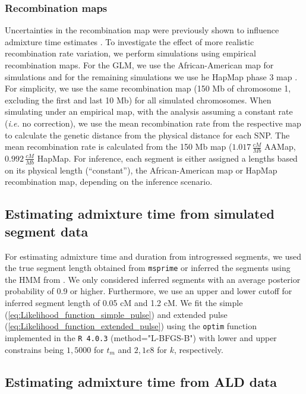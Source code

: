 \documentclass[11pt]{article}
\begin{document}
\subsubsection{Recombination maps}\label{recombination map}
Uncertainties in the recombination map were previously shown to influence admixture time estimates \citep{sankararaman_date_2012,fu_genome_2014,sankararaman_combined_2016}. To investigate the effect of more realistic
recombination rate variation, we perform simulations using empirical recombination maps. For the GLM, we use the  African-American map \citep{hinch_landscape_2011} for simulations and for the remaining simulations we use he HapMap phase 3 map \citep{HapMapConsortium_second_2007}. For simplicity, we use the same
recombination map (150 Mb of chromosome 1, excluding the first and last 10 Mb)
for all simulated chromosomes. When simulating under an empirical map, with the analysis assuming a constant rate (\emph{i.e.} no correction), we use the mean recombination rate from the respective map to calculate the genetic distance from the physical distance for each SNP. The mean recombination rate is
calculated from the 150 Mb map (\(1.017 \, \frac{cM}{Mb}\) AAMap,
\(0.992 \, \frac{cM}{Mb}\) HapMap. For inference, each segment is either assigned a lengths based on its physical length (``constant''), the African-American map or HapMap recombination map, depending on the inference scenario.

\subsection{Estimating admixture time from simulated segment data}\label{Estimating admixture time from simulated segment data}

For estimating admixture time and duration from introgressed segments, we used the true segment length obtained from \texttt{msprime} or inferred the segments using the HMM from \cite{skov_detecting_2018}. We only considered inferred segments with an average posterior probability of 0.9 or higher. Furthermore, we use an upper and lower cutoff for inferred segment length of 0.05 cM and 1.2 cM. We fit the simple (\ref{eq:Likelihood_function_simple_pulse}) and extended pulse (\ref{eq:Likelihood_function_extended_pulse}) using the \texttt{optim} function implemented in the \texttt{R 4.0.3} (method="L-BFGS-B") with lower and upper constrains being $1,5000$ for $t_m$ and $2,1e8$ for $k$, respectively. 

\subsection{Estimating admixture time from ALD data}\label{Estimating admixture time from ALD data}
\end{document}
